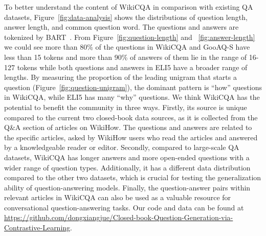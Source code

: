 \documentclass[11pt]{article}
\begin{document}
To better understand the content of WikiCQA in comparison with existing QA datasets, Figure~\ref{fig:data-analysis} shows the distributions of question length, answer length, and common question word. The questions and answers are tokenized by BART~\cite{lewis-etal-2020-bart}. From Figure~\ref{fig:question-length} and ~\ref{fig:answer-length} we could see more than 80\% of the questions in WikiCQA and GooAQ-S have less than 15 tokens and more than 90\% of answers of them lie in the range of 16-127 tokens while both questions and answers in ELI5 have a broader range of lengths. By measuring the proportion of the leading unigram that starts a question (Figure~\ref{fig:question-unigram}), the dominant pattern is ``how'' questions in WikiCQA, while ELI5 has many ``why'' questions. We think WikiCQA has the potential to benefit the community in three ways. Firstly, its source is unique compared to the current two closed-book data sources, as it is collected from the Q\&A section of articles on WikiHow. The questions and answers are related to the specific articles, asked by WikiHow users who read the articles and answered by a knowledgeable reader or editor. Secondly, compared to large-scale QA datasets, WikiCQA has longer answers and more open-ended questions with a wider range of question types. Additionally, it has a different data distribution compared to the other two datasets, which is crucial for testing the generalization ability of question-answering models. Finally, the question-answer pairs within relevant articles in WikiCQA can also be used as a valuable resource for conversational question-answering tasks. Our code and data can be found at \href{https://github.com/dongxiangjue/Closed-book-Question-Generation-via-Contrastive-Learning}{https://github.com/dongxiangjue/Closed-book-Question-Generation-via-Contrastive-Learning}.
\end{document}
